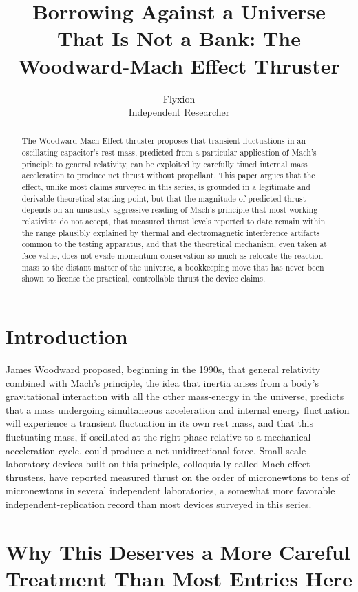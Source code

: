 \documentclass[11pt]{article}
\title{Borrowing Against a Universe That Is Not a Bank: The Woodward-Mach Effect Thruster}
\author{Flyxion \\ \small Independent Researcher}
\date{}
\begin{document}
\maketitle

\begin{abstract}
The Woodward-Mach Effect thruster proposes that transient fluctuations in an oscillating capacitor's rest mass, predicted from a particular application of Mach's principle to general relativity, can be exploited by carefully timed internal mass acceleration to produce net thrust without propellant. This paper argues that the effect, unlike most claims surveyed in this series, is grounded in a legitimate and derivable theoretical starting point, but that the magnitude of predicted thrust depends on an unusually aggressive reading of Mach's principle that most working relativists do not accept, that measured thrust levels reported to date remain within the range plausibly explained by thermal and electromagnetic interference artifacts common to the testing apparatus, and that the theoretical mechanism, even taken at face value, does not evade momentum conservation so much as relocate the reaction mass to the distant matter of the universe, a bookkeeping move that has never been shown to license the practical, controllable thrust the device claims.
\end{abstract}

\section{Introduction}

James Woodward proposed, beginning in the 1990s, that general relativity combined with Mach's principle, the idea that inertia arises from a body's gravitational interaction with all the other mass-energy in the universe, predicts that a mass undergoing simultaneous acceleration and internal energy fluctuation will experience a transient fluctuation in its own rest mass, and that this fluctuating mass, if oscillated at the right phase relative to a mechanical acceleration cycle, could produce a net unidirectional force. Small-scale laboratory devices built on this principle, colloquially called Mach effect thrusters, have reported measured thrust on the order of micronewtons to tens of micronewtons in several independent laboratories, a somewhat more favorable independent-replication record than most devices surveyed in this series.

\section{Why This Deserves a More Careful Treatment Than Most Entries Here}
\end{document}
